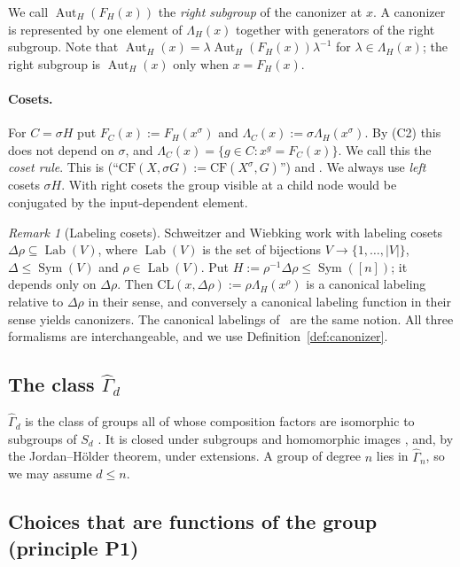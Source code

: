\documentclass[11pt]{article}
\theoremstyle{plain}
\theoremstyle{definition}
\theoremstyle{remark}
\newtheorem{remark}[theorem]{Remark}
\theoremstyle{named}
\theoremstyle{namedrm}
\newcommand{\Sym}{\operatorname{Sym}}
\newcommand{\Aut}{\operatorname{Aut}}
\newcommand{\Lab}{\operatorname{Lab}}
\newcommand{\Gd}{\widehat{\Gamma}_d}
\newcommand{\Gq}[1]{\widehat{\Gamma}_{#1}}
\begin{document}
We call $\Aut_H(F_H(x))$ the \emph{right subgroup} of the canonizer at $x$. A canonizer is represented by
one element of $\Lambda_H(x)$ together with generators of the right subgroup. Note that
$\Aut_H(x)=\lambda\Aut_H(F_H(x))\lambda^{-1}$ for $\lambda\in\Lambda_H(x)$; the right subgroup is
$\Aut_H(x)$ only when $x=F_H(x)$.

\paragraph{Cosets.} For $C=\sigma H$ put $F_C(x):=F_H(x^\sigma)$ and $\Lambda_C(x):=\sigma\Lambda_H(x^\sigma)$.
By (C2) this does not depend on $\sigma$, and $\Lambda_C(x)=\{g\in C:x^g=F_C(x)\}$. We call this the
\emph{coset rule}. This is
\cite[\S2.1]{BL83} (``$\mathrm{CF}(X,\sigma G):=\mathrm{CF}(X^\sigma,G)$'') and \cite[Def.~5.1(i)]{Bab19}.
We always use \emph{left} cosets $\sigma H$. With right cosets the group visible at a child node would be
conjugated by the input-dependent element.

\begin{remark}[Labeling cosets]\label{rem:labcosets}
Schweitzer and Wiebking work with labeling cosets $\Delta\rho\subseteq\Lab(V)$, where $\Lab(V)$ is the set
of bijections $V\to\{1,\dots,|V|\}$, $\Delta\le\Sym(V)$ and $\rho\in\Lab(V)$. Put
$H:=\rho^{-1}\Delta\rho\le\Sym([n])$; it depends only on $\Delta\rho$. Then
$\mathrm{CL}(x,\Delta\rho):=\rho\Lambda_H(x^\rho)$ is a canonical labeling relative to $\Delta\rho$ in their
sense, and conversely a canonical labeling function in their sense yields canonizers. The canonical
labelings of~\cite{BL83} are the same notion. All three formalisms are interchangeable, and we use
Definition~\ref{def:canonizer}.
\end{remark}

\subsection{The class $\Gd$}

$\Gd$ is the class of groups all of whose composition factors are isomorphic to subgroups of $S_d$
\cite[Def.~2.3]{GNS}. It is closed under subgroups and homomorphic images \cite[Lemma~2.4]{GNS}, and,
by the Jordan--Hölder theorem, under extensions. A group of degree $n$ lies in $\Gq{n}$, so we may assume
$d\le n$.

\subsection{Choices that are functions of the group (principle P1)}\label{sec:P1}
\end{document}
